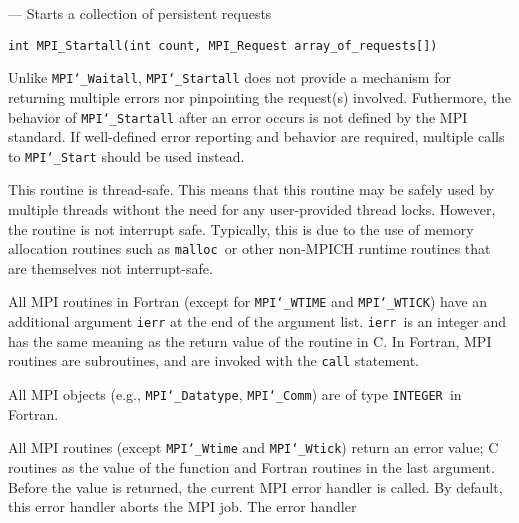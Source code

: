 \startmanpage
{}
--- Starts a collection of persistent requests  
\startvb\begin{verbatim}
int MPI_Startall(int count, MPI_Request array_of_requests[])

\end{verbatim}
\endvb

\par
{}
\par
Unlike {\tt MPI{\tt \char`\_}Waitall}, {\tt MPI{\tt \char`\_}Startall} does not provide a mechanism for
returning multiple errors nor pinpointing the request(s) involved.
Futhermore, the behavior of {\tt MPI{\tt \char`\_}Startall} after an error occurs is not
defined by the MPI standard.  If well-defined error reporting and behavior
are required, multiple calls to {\tt MPI{\tt \char`\_}Start} should be used instead.
\par
{}
\par
This routine is thread-safe.  This means that this routine may be
safely used by multiple threads without the need for any user-provided
thread locks.  However, the routine is not interrupt safe.  Typically,
this is due to the use of memory allocation routines such as {\tt malloc
}or other non-MPICH runtime routines that are themselves not interrupt-safe.
\par
{}
All MPI routines in Fortran (except for {\tt MPI{\tt \char`\_}WTIME} and {\tt MPI{\tt \char`\_}WTICK}) have
an additional argument {\tt ierr} at the end of the argument list.  {\tt ierr
}is an integer and has the same meaning as the return value of the routine
in C.  In Fortran, MPI routines are subroutines, and are invoked with the
{\tt call} statement.
\par
All MPI objects (e.g., {\tt MPI{\tt \char`\_}Datatype}, {\tt MPI{\tt \char`\_}Comm}) are of type {\tt INTEGER
}in Fortran.
\par
{}
\par
All MPI routines (except {\tt MPI{\tt \char`\_}Wtime} and {\tt MPI{\tt \char`\_}Wtick}) return an error value;
C routines as the value of the function and Fortran routines in the last
argument.  Before the value is returned, the current MPI error handler is
called.  By default, this error handler aborts the MPI job.  The error handler
